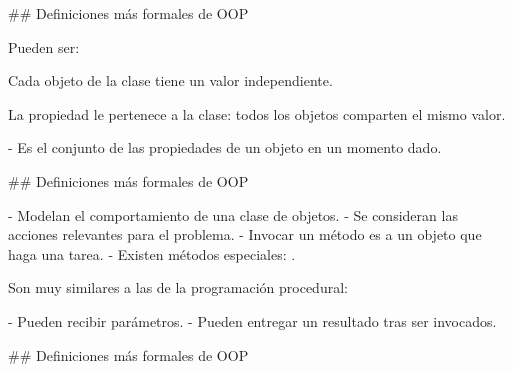 ## Definiciones más formales de OOP

\newline

Pueden ser:

\begin{description}[leftmargin=3em]
    \item[De instancia:] Cada objeto de la clase tiene un valor independiente.
    \item[De clase:] La propiedad le pertenece a la clase: todos los objetos
    comparten el mismo valor.
\end{description}

\vfill
{}

- Es el conjunto de las propiedades de un objeto en un momento dado.

## Definiciones más formales de OOP


- Modelan el comportamiento de una clase de objetos.
- Se consideran las acciones relevantes para el problema.
- Invocar un método es  a un objeto que haga una tarea.
- Existen métodos especiales: .

\vfill
Son muy similares a las  de la programación procedural:

- Pueden recibir parámetros.
- Pueden entregar un resultado tras ser invocados.

## Definiciones más formales de OOP


\vfill

\centering{}

